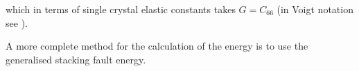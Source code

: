 which in terms of single crystal elastic constants takes $G=C_{66}$ (in Voigt notation see \cite{kelly_knowles2012chapter6_stress_strain}).

A more complete method for the calculation of the energy is to use the generalised stacking fault energy.






























